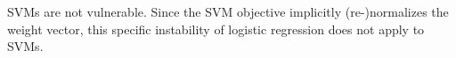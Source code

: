 \begin{answer}
  SVMs are not vulnerable. Since the SVM objective implicitly (re-)normalizes the weight vector, this specific instability of logistic regression does not apply to SVMs.
\end{answer}
